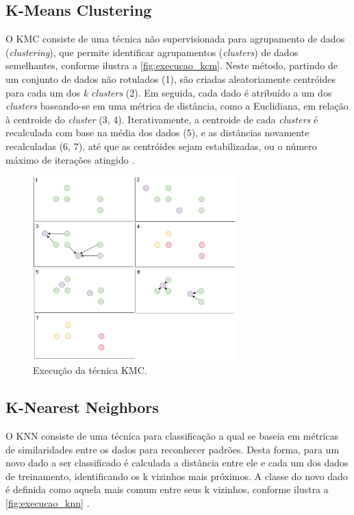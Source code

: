\subsection{K-Means Clustering}

O KMC consiste de uma técnica não supervisionada para agrupamento de dados (\textit{clustering}), que permite identificar agrupamentos (\textit{clusters}) de dados semelhantes, conforme ilustra a \autoref{fig:execucao_kcm}. Neste método, partindo de um conjunto de dados não rotulados (1), são criadas aleatoriamente centróides para cada um dos \textit{k clusters} (2). Em seguida, cada dado é atribuído a um dos \textit{clusters} baseando-se em uma métrica de distância, como a Euclidiana, em relação à centroide do \textit{cluster} (3, 4). Iterativamente, a centroide de cada \textit{clusters} é recalculada com base na média dos dados (5), e as distâncias novamente recalculadas (6, 7), até que as centróides sejam estabilizadas, ou o número máximo de iterações atingido \cite{foley2019,nisbet2009}.

\begin{figure}[h]
  \centering
  \caption{Execução da técnica KMC.}
   \label{fig:execucao_kcm}
   \includegraphics[width=0.7\textwidth]{figuras/fig_5.png}
\end{figure}

\subsection{K-Nearest Neighbors}

O KNN consiste de uma técnica para classificação a qual se baseia em métricas de similaridades entre os dados para reconhecer padrões. Desta forma, para um novo dado a ser classificado é calculada a distância entre ele e cada um dos dados de treinamento, identificando os k vizinhos mais próximos. A classe do novo dado é definida como aquela mais comum entre seus k vizinhos, conforme ilustra a \autoref{fig:execucao_knn} \cite{Khandelwal2018}.


